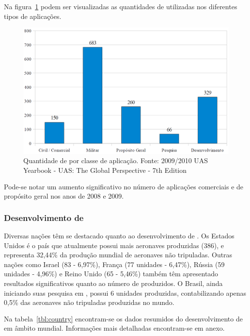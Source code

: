 Na figura~\ref{fig:qt_uav_app} podem ser visualizadas as quantidades de \vants utilizadas nos diferentes tipos de aplicações.

\begin{figure}[h!]
\centering
\includegraphics[width=13cm]{pictures/qt_uavs_app.png}
\caption{Quantidade de \vants por classe de aplicação. Fonte: 2009/2010 UAS Yearbook - UAS: The Global Perspective - 7th Edition}
 \label{fig:qt_uav_app}
\end{figure}

Pode-se notar um aumento significativo no número de aplicações comerciais e de propósito geral nos anos de 2008 e 2009.

\subsubsection{Desenvolvimento de \vants}

Diversas nações têm se destacado quanto ao desenvolvimento de \vants. Os Estados Unidos é o país que atualmente possui mais aeronaves produzidas (386), e representa 32,44\% da
produção mundial de aeronaves não tripuladas. Outras nações como Israel (83 - 6,97\%),  França (77 unidades - 6,47\%), Rússia (59 unidades - 4,96\%) e Reino Unido (65 - 5,46\%) também têm apresentado resultados significativos quanto ao número de \vants produzidos. O Brasil, ainda iniciando suas pesquisa em \vants, possui 6 unidades produzidas, contabilizando apenas 0,5\% das aeronaves não tripuladas produzidas no mundo.

Na tabela~\ref{tbl:country} encontram-se os dados resumidos do desenvolvimento de \vants em âmbito mundial. Informações mais detalhadas encontram-se em anexo.

